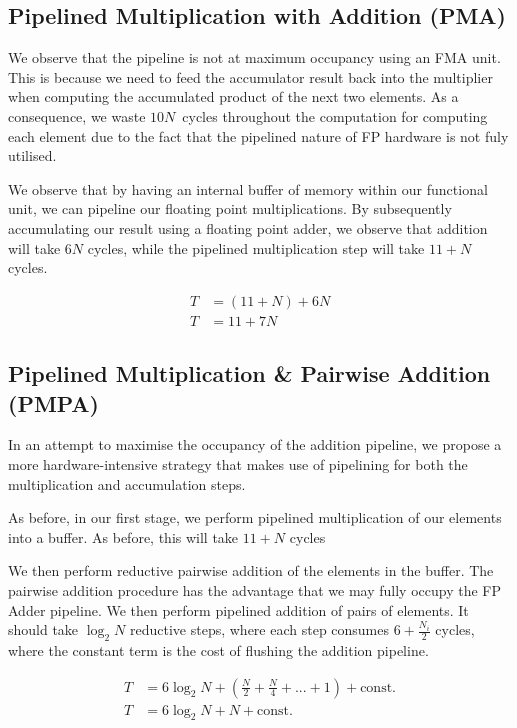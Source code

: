 \documentclass[a4paper,8pt]{report}
\begin{document}

\subsection{Pipelined Multiplication with Addition (PMA)}
We observe that the pipeline is not at maximum occupancy using an FMA unit. This
is because we need to feed the accumulator result back into the multiplier when
computing the accumulated product of the next two elements. As a consequence, we
waste $10N$~cycles throughout the computation for computing each element due to
the fact that the pipelined nature of FP hardware is not fuly utilised.

We observe that by having an internal buffer of memory within our functional
unit, we can pipeline our floating point multiplications. By subsequently
accumulating our result using a floating point adder, we observe that addition
will take $6N$ cycles, while the pipelined multiplication step will take $11+N$
cycles.

\begin{align*}
  T &= (11 + N) + 6N \\
  T &= 11 + 7N
\end{align*}
\subsection{Pipelined Multiplication \& Pairwise Addition (PMPA)}
In an attempt to maximise the occupancy of the addition pipeline, we propose a
more hardware-intensive strategy that makes use of pipelining for both the
multiplication and accumulation steps.

As before, in our first stage, we perform pipelined multiplication of our
elements into a buffer. As before, this will take $11+N$ cycles

We then perform reductive pairwise addition of the elements in the buffer.
The pairwise addition procedure has the advantage that we may fully occupy the
FP Adder pipeline. We then perform pipelined addition of pairs of elements.
It should take $\log_2{N}$ reductive steps, where each step consumes
$6+\frac{N_{i}}{2}$ cycles, where the constant term is the cost of flushing the
addition pipeline.

\begin{align*}
  T &= 6\log_2{N} + \left(\frac{N}{2} + \frac{N}{4} + ... + 1\right) + \text{const.}\\
  T &= 6\log_2{N} + N + \text{const.}
\end{align*}
\end{document}
